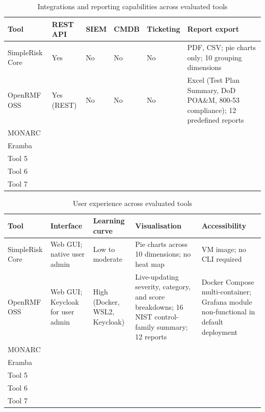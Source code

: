 \begin{table}[H]
\centering
\renewcommand{\arraystretch}{1.3}
\small
\caption{Integrations and reporting capabilities across evaluated tools}
\label{tab:comp-integrations}
\begin{tabular}{|p{2.3cm}|p{1.5cm}|p{1.2cm}|p{1.2cm}|p{1.5cm}|p{4cm}|}
\hline
\textbf{Tool} & \textbf{REST API} & \textbf{SIEM} & \textbf{CMDB} & \textbf{Ticketing} & \textbf{Report export} \\
\hline
SimpleRisk Core & Yes & No & No & No & PDF, CSV; pie charts only; 10 grouping dimensions \\
\hline
OpenRMF OSS    & Yes (REST) & No & No & No & Excel (Test Plan Summary, DoD POA\&M, 800-53 compliance); 12 predefined reports \\
\hline
MONARC         & & & & & \\
\hline
Eramba         & & & & & \\
\hline
Tool 5         & & & & & \\
\hline
Tool 6         & & & & & \\
\hline
Tool 7         & & & & & \\
\hline
\end{tabular}
\end{table}


\begin{table}[H]
\centering
\renewcommand{\arraystretch}{1.3}
\small
\caption{User experience across evaluated tools}
\label{tab:comp-ux}
\begin{tabular}{|p{2.3cm}|p{2.8cm}|p{2.8cm}|p{3cm}|p{2.8cm}|}
\hline
\textbf{Tool} & \textbf{Interface} & \textbf{Learning curve} & \textbf{Visualisation} & \textbf{Accessibility} \\
\hline
SimpleRisk Core & Web GUI; native user admin & Low to moderate & Pie charts across 10 dimensions; no heat map & VM image; no CLI required \\
\hline
OpenRMF OSS    & Web GUI; Keycloak for user admin & High (Docker, WSL2, Keycloak) & Live-updating severity, category, and score breakdowns; 16 NIST control-family summary; 12 reports & Docker Compose multi-container; Grafana module non-functional in default deployment \\
\hline
MONARC         & & & & \\
\hline
Eramba         & & & & \\
\hline
Tool 5         & & & & \\
\hline
Tool 6         & & & & \\
\hline
Tool 7         & & & & \\
\hline
\end{tabular}
\end{table}

